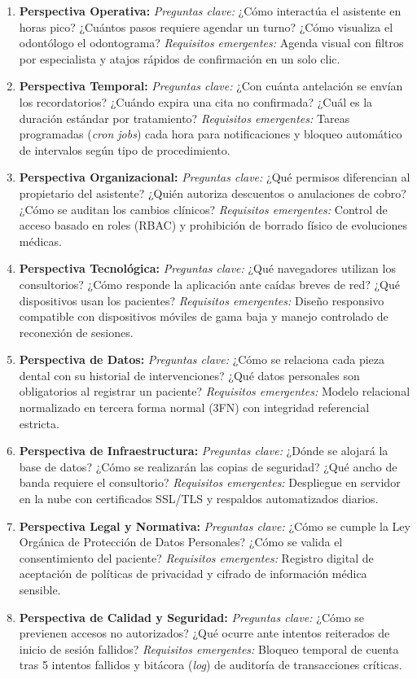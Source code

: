 \documentclass[11pt,a4paper]{article}
\begin{document}
\begin{enumerate}
    \item \textbf{Perspectiva Operativa:} \textit{Preguntas clave:} ¿Cómo interactúa el asistente en horas pico? ¿Cuántos pasos requiere agendar un turno? ¿Cómo visualiza el odontólogo el odontograma? \textit{Requisitos emergentes:} Agenda visual con filtros por especialista y atajos rápidos de confirmación en un solo clic.
    \item \textbf{Perspectiva Temporal:} \textit{Preguntas clave:} ¿Con cuánta antelación se envían los recordatorios? ¿Cuándo expira una cita no confirmada? ¿Cuál es la duración estándar por tratamiento? \textit{Requisitos emergentes:} Tareas programadas (\textit{cron jobs}) cada hora para notificaciones y bloqueo automático de intervalos según tipo de procedimiento.
    \item \textbf{Perspectiva Organizacional:} \textit{Preguntas clave:} ¿Qué permisos diferencian al propietario del asistente? ¿Quién autoriza descuentos o anulaciones de cobro? ¿Cómo se auditan los cambios clínicos? \textit{Requisitos emergentes:} Control de acceso basado en roles (RBAC) y prohibición de borrado físico de evoluciones médicas.
    \item \textbf{Perspectiva Tecnológica:} \textit{Preguntas clave:} ¿Qué navegadores utilizan los consultorios? ¿Cómo responde la aplicación ante caídas breves de red? ¿Qué dispositivos usan los pacientes? \textit{Requisitos emergentes:} Diseño responsivo compatible con dispositivos móviles de gama baja y manejo controlado de reconexión de sesiones.
    \item \textbf{Perspectiva de Datos:} \textit{Preguntas clave:} ¿Cómo se relaciona cada pieza dental con su historial de intervenciones? ¿Qué datos personales son obligatorios al registrar un paciente? \textit{Requisitos emergentes:} Modelo relacional normalizado en tercera forma normal (3FN) con integridad referencial estricta.
    \item \textbf{Perspectiva de Infraestructura:} \textit{Preguntas clave:} ¿Dónde se alojará la base de datos? ¿Cómo se realizarán las copias de seguridad? ¿Qué ancho de banda requiere el consultorio? \textit{Requisitos emergentes:} Despliegue en servidor en la nube con certificados SSL/TLS y respaldos automatizados diarios.
    \item \textbf{Perspectiva Legal y Normativa:} \textit{Preguntas clave:} ¿Cómo se cumple la Ley Orgánica de Protección de Datos Personales? ¿Cómo se valida el consentimiento del paciente? \textit{Requisitos emergentes:} Registro digital de aceptación de políticas de privacidad y cifrado de información médica sensible.
    \item \textbf{Perspectiva de Calidad y Seguridad:} \textit{Preguntas clave:} ¿Cómo se previenen accesos no autorizados? ¿Qué ocurre ante intentos reiterados de inicio de sesión fallidos? \textit{Requisitos emergentes:} Bloqueo temporal de cuenta tras 5 intentos fallidos y bitácora (\textit{log}) de auditoría de transacciones críticas.
\end{enumerate}
\end{document}
